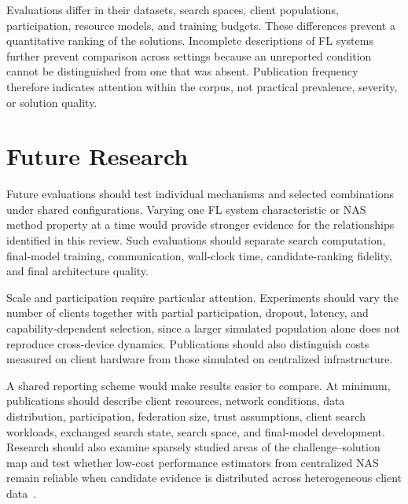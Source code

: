 Evaluations differ in their datasets, search spaces, client populations, participation, resource models, and training budgets. These differences prevent a quantitative ranking of the solutions. Incomplete descriptions of FL systems further prevent comparison across settings because an unreported condition cannot be distinguished from one that was absent. Publication frequency therefore indicates attention within the corpus, not practical prevalence, severity, or solution quality.

\section{Future Research}

Future evaluations should test individual mechanisms and selected combinations under shared configurations. Varying one FL system characteristic or NAS method property at a time would provide stronger evidence for the relationships identified in this review. Such evaluations should separate search computation, final-model training, communication, wall-clock time, candidate-ranking fidelity, and final architecture quality.

Scale and participation require particular attention. Experiments should vary the number of clients together with partial participation, dropout, latency, and capability-dependent selection, since a larger simulated population alone does not reproduce cross-device dynamics. Publications should also distinguish costs measured on client hardware from those simulated on centralized infrastructure.

A shared reporting scheme would make results easier to compare. At minimum, publications should describe client resources, network conditions, data distribution, participation, federation size, trust assumptions, client search workloads, exchanged search state, search space, and final-model development. Research should also examine sparsely studied areas of the challenge--solution map and test whether low-cost performance estimators from centralized NAS remain reliable when candidate evidence is distributed across heterogeneous client data~\cite{nas_in_fl_2026}.
